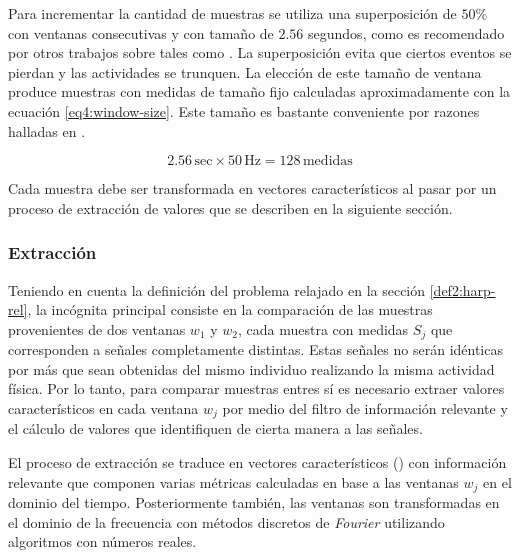 Para incrementar la cantidad de muestras se utiliza una superposición
de $50\%$ con ventanas consecutivas y con tamaño de $2.56$ segundos,
como es recomendado por otros trabajos sobre  tales como
\cite{Bao2004,ReyesOrtiz2015}. La superposición evita que ciertos
eventos se pierdan y las actividades se trunquen. La elección de este
tamaño de ventana produce muestras con medidas de tamaño fijo calculadas
aproximadamente con la ecuación \ref{eq4:window-size}. Este tamaño
es bastante conveniente por razones halladas en \cite{ReyesOrtiz2015}.

\begin{equation}
2.56\,\mathrm{sec}\times50\mathrm{\,Hz}=128\,\mathrm{medidas}\label{eq4:window-size}
\end{equation}

Cada muestra debe ser transformada en vectores característicos al
pasar por un proceso de extracción de valores que se describen en
la siguiente sección.

\subsubsection{Extracción}

\label{ssec44:extraction}Teniendo en cuenta la definición del problema
relajado en la sección \ref{def2:harp-rel}, la incógnita principal
consiste en la comparación de las muestras provenientes de dos ventanas
$w_{1}$ y $w_{2}$, cada muestra con medidas $S_{j}$ que corresponden
a señales completamente distintas. Estas señales no serán idénticas
por más que sean obtenidas del mismo individuo realizando la misma
actividad física. Por lo tanto, para comparar muestras entres sí es
necesario extraer valores característicos en cada ventana $w_{j}$
por medio del filtro de información relevante y el cálculo de valores
que identifiquen de cierta manera a las señales. 

El proceso de extracción se traduce en vectores característicos (\emph{})
con información relevante que componen varias métricas calculadas
en base a las ventanas $w_{j}$ en el dominio del tiempo. Posteriormente
también, las ventanas son transformadas en el dominio de la frecuencia
con métodos discretos de\emph{ Fourier} utilizando algoritmos 
con números reales. 

